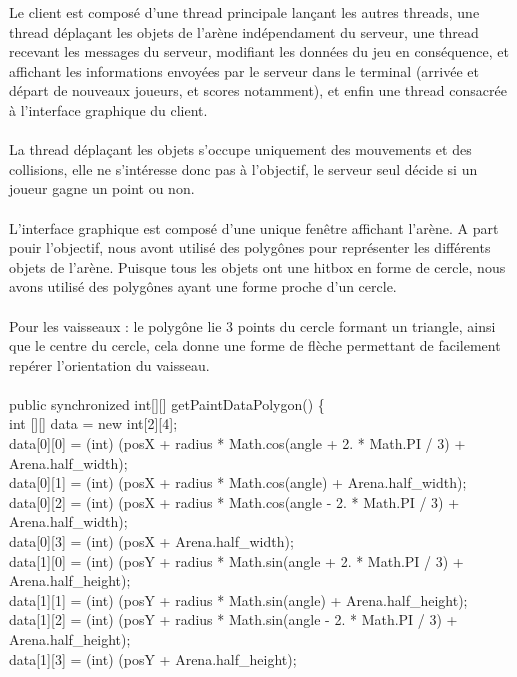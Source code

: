 \documentclass{article}
\begin{document}
Le client est composé d'une thread principale lançant les autres threads, une thread déplaçant les objets de l'arène indépendament du serveur,
une thread recevant les messages du serveur, modifiant les données du jeu en conséquence, et affichant les informations envoyées par le serveur
dans le terminal (arrivée et départ de nouveaux joueurs, et scores notamment), et enfin une thread consacrée à l'interface graphique du client.\\
\\
La thread déplaçant les objets s'occupe uniquement des mouvements et des collisions, elle ne s'intéresse donc pas à l'objectif, le serveur seul décide si
un joueur gagne un point ou non.\\
\\
L'interface graphique est composé d'une unique fenêtre affichant l'arène. A part pouir l'objectif, nous avont utilisé des polygônes pour représenter les différents
objets de l'arène. Puisque tous les objets ont une hitbox en forme de cercle, nous avons utilisé des polygônes ayant une forme proche d'un cercle.\\
\\
Pour les vaisseaux : le polygône lie 3 points du cercle formant un triangle, ainsi que le centre du cercle, cela donne une forme de flèche
permettant de facilement repérer l'orientation du vaisseau.\\
\\
public synchronized int[][] getPaintDataPolygon() \{\\
  int [][] data = new int[2][4];\\
  data[0][0] = (int) (posX + radius * Math.cos(angle + 2. * Math.PI / 3) + Arena.half\_width);\\
  data[0][1] = (int) (posX + radius * Math.cos(angle) + Arena.half\_width);\\
  data[0][2] = (int) (posX + radius * Math.cos(angle - 2. * Math.PI / 3) + Arena.half\_width);\\
  data[0][3] = (int) (posX + Arena.half\_width);\\
  data[1][0] = (int) (posY + radius * Math.sin(angle + 2. * Math.PI / 3) + Arena.half\_height);\\
  data[1][1] = (int) (posY + radius * Math.sin(angle) + Arena.half\_height);\\
  data[1][2] = (int) (posY + radius * Math.sin(angle - 2. * Math.PI / 3) + Arena.half\_height);\\
  data[1][3] = (int) (posY + Arena.half\_height);\\
\end{document}
